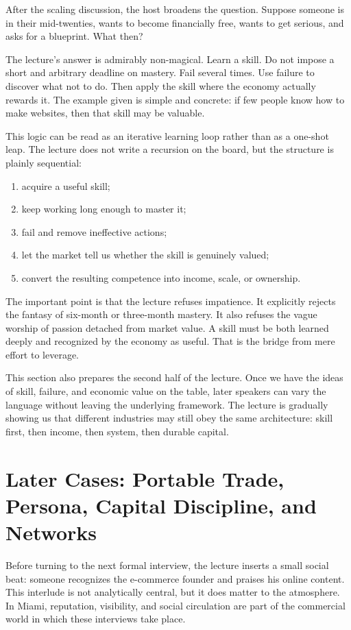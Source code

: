 After the scaling discussion, the host broadens the question. Suppose someone is in their mid-twenties, wants to become financially free, wants to get serious, and asks for a blueprint. What then?

The lecture's answer is admirably non-magical. Learn a skill. Do not impose a short and arbitrary deadline on mastery. Fail several times. Use failure to discover what not to do. Then apply the skill where the economy actually rewards it. The example given is simple and concrete: if few people know how to make websites, then that skill may be valuable.

This logic can be read as an iterative learning loop rather than as a one-shot leap. The lecture does not write a recursion on the board, but the structure is plainly sequential:
\begin{enumerate}
\item acquire a useful skill;
\item keep working long enough to master it;
\item fail and remove ineffective actions;
\item let the market tell us whether the skill is genuinely valued;
\item convert the resulting competence into income, scale, or ownership.
\end{enumerate}

The important point is that the lecture refuses impatience. It explicitly rejects the fantasy of six-month or three-month mastery. It also refuses the vague worship of passion detached from market value. A skill must be both learned deeply and recognized by the economy as useful. That is the bridge from mere effort to leverage.

This section also prepares the second half of the lecture. Once we have the ideas of skill, failure, and economic value on the table, later speakers can vary the language without leaving the underlying framework. The lecture is gradually showing us that different industries may still obey the same architecture: skill first, then income, then system, then durable capital.

\section{Later Cases: Portable Trade, Persona, Capital Discipline, and Networks}

Before turning to the next formal interview, the lecture inserts a small social beat: someone recognizes the e-commerce founder and praises his online content. This interlude is not analytically central, but it does matter to the atmosphere. In Miami, reputation, visibility, and social circulation are part of the commercial world in which these interviews take place.

